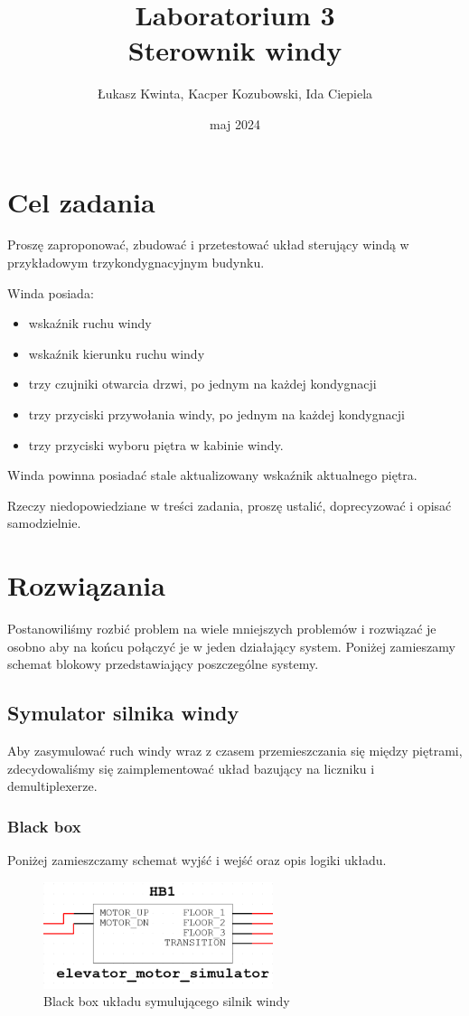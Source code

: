 \documentclass[a4paper]{article}
\title{\fontsize{30pt}{30pt}\selectfont Laboratorium 3 \\ Sterownik windy}
\author{\fontsize{20pt}{20pt}\selectfont Łukasz Kwinta, Kacper Kozubowski, Ida Ciepiela}
\date{maj 2024}
\begin{document}
\maketitle
\pagebreak
\large
\tableofcontents

\pagebreak
\section{Cel zadania}
\Large
Proszę zaproponować, zbudować i przetestować układ sterujący windą w przykładowym trzykondygnacyjnym budynku.

Winda posiada:
\begin{itemize}
    \item wskaźnik ruchu windy
    \item wskaźnik kierunku ruchu windy
    \item trzy czujniki otwarcia drzwi, po jednym na każdej kondygnacji
    \item trzy przyciski przywołania windy, po jednym na każdej kondygnacji
    \item trzy przyciski wyboru piętra w kabinie windy.
\end{itemize}

Winda powinna posiadać stale aktualizowany wskaźnik aktualnego piętra.

Rzeczy niedopowiedziane w treści zadania, proszę ustalić, doprecyzować i opisać samodzielnie.

\section{Rozwiązania}
Postanowiliśmy rozbić problem na wiele mniejszych problemów i rozwiązać je osobno aby 
na końcu połączyć je w jeden działający system. Poniżej zamieszamy schemat blokowy 
przedstawiający poszczególne systemy.

\subsection{Symulator silnika windy}
Aby zasymulować ruch windy wraz z czasem przemieszczania się między piętrami, zdecydowaliśmy się 
zaimplementować układ bazujący na liczniku i demultiplexerze.

\subsubsection{Black box}
Poniżej zamieszczamy schemat wyjść i wejść oraz opis logiki układu.
\begin{figure}[H]
    \centering
    \includegraphics[width=0.6\textwidth]{elevator_motor_simulator.png}
    \caption{Black box układu symulującego silnik windy}
\end{figure}
\end{document}
